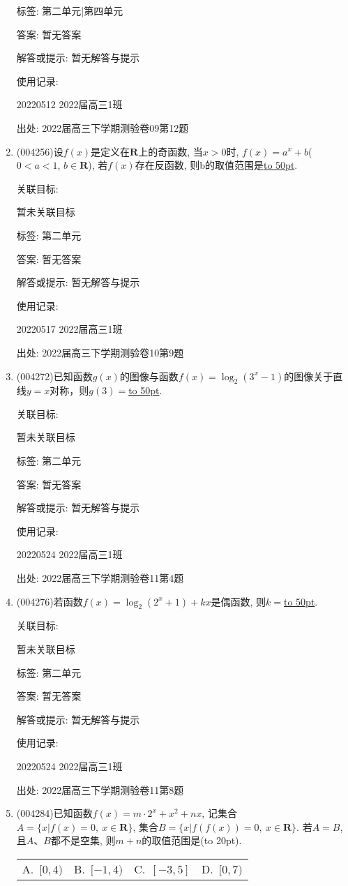 \documentclass[10pt,a4paper]{article}
\newcommand{\blank}[1]{\underline{\hbox to #1pt{}}}
\newcommand{\bracket}[1]{(\hbox to #1pt{})}
\newcommand{\fourch}[4]{\par\begin{tabular}{p{.23\textwidth}p{.23\textwidth}p{.23\textwidth}p{.23\textwidth}}
A.~#1 &B.~#2& C.~#3& D.~#4
\end{tabular}}
\begin{document}
\begin{enumerate}[1.]
标签: 第二单元|第四单元

答案: 暂无答案

解答或提示: 暂无解答与提示

使用记录:

20220512	2022届高三1班	


出处: 2022届高三下学期测验卷09第12题
\item { (004256)}设$f(x)$是定义在$\mathbf{R}$上的奇函数, 当$x>0$时, $f(x)=a^x+b$($0<a<1$, $b\in \mathbf{R}$), 若$f(x)$存在反函数, 则b的取值范围是\blank{50}.


关联目标:

暂未关联目标



标签: 第二单元

答案: 暂无答案

解答或提示: 暂无解答与提示

使用记录:

20220517	2022届高三1班	


出处: 2022届高三下学期测验卷10第9题
\item { (004272)}已知函数$g(x)$的图像与函数$f(x)=\log_2(3^x-1)$的图像关于直线$y=x$对称，则$g(3)=$\blank{50}.


关联目标:

暂未关联目标



标签: 第二单元

答案: 暂无答案

解答或提示: 暂无解答与提示

使用记录:

20220524	2022届高三1班	


出处: 2022届高三下学期测验卷11第4题
\item { (004276)}若函数$f(x)=\log_2(2^x+1)+kx$是偶函数, 则$k=$\blank{50}.


关联目标:

暂未关联目标



标签: 第二单元

答案: 暂无答案

解答或提示: 暂无解答与提示

使用记录:

20220524	2022届高三1班	


出处: 2022届高三下学期测验卷11第8题
\item { (004284)}已知函数$f(x)=m\cdot 2^x+x^2+nx$, 记集合$A=\{x|f(x)=0, \ x\in \mathbf{R}\}$, 集合$B=\{x|f(f(x))=0, \ x\in \mathbf{R}\}$.
若$A=B$, 且$A$、$B$都不是空集, 则$m+n$的取值范围是\bracket{20}.
\fourch{$[0,4)$}{$[-1,4)$}{$[-3,5]$}{$[0,7)$}



\end{enumerate}
\end{document}
